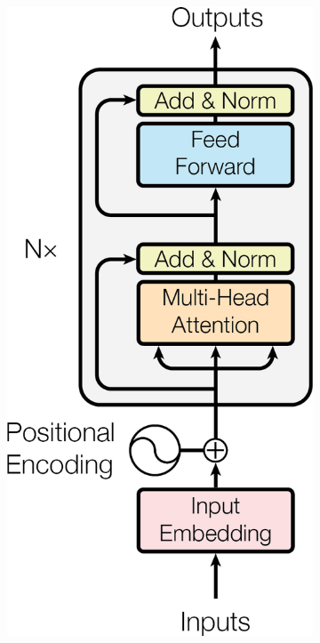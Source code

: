 \begin{figure}[htbp]
    \centering
    \begin{subfigure}{0.3\textwidth}
        \includegraphics[width=\textwidth]{images/Transformer/TF_Encoder.png}


\end{subfigure}
\end{figure}
